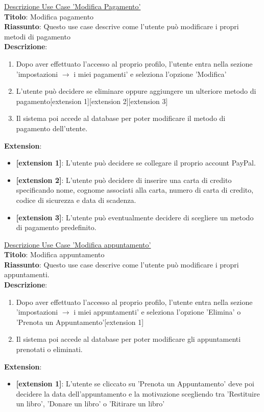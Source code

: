 \documentclass{article}
\begin{document}
    \noindent\underline{Descrizione Use Case 'Modifica Pagamento'}\\
    \textbf{Titolo}: Modifica pagamento\\
    \textbf{Riassunto}: Questo use case descrive come l'utente può modificare i propri metodi di pagamento\\
    \textbf{Descrizione}: 
        \begin{enumerate}
        \item Dopo aver effettuato l'accesso al proprio profilo, l'utente entra nella sezione 'impostazioni $\rightarrow$ i miei pagamenti' e seleziona l'opzione 'Modifica'
        \item L'utente può decidere se eliminare oppure aggiungere un ulteriore metodo di pagamento[extension 1][extension 2][extension 3]
        \item Il sistema poi accede al database per poter modificare il metodo di pagamento dell'utente.
    \end{enumerate}
    \textbf{Extension}: 
        \begin{itemize}
            \item \textbf{[extension 1]}: L'utente può decidere se collegare il proprio account PayPal.
            \item \textbf{[extension 2]}: L'utente può decidere di inserire una carta di credito specificando nome, cognome associati alla carta, numero di carta di credito, codice di sicurezza e data di scadenza.
            \item \textbf{[extension 3]}: L'utente può eventualmente decidere di scegliere un metodo di pagamento predefinito.
        \end{itemize}

    \noindent\underline{Descrizione Use Case 'Modifica appuntamento'}\\
    \textbf{Titolo}: Modifica appuntamento\\
    \textbf{Riassunto}: Questo use case descrive come l'utente può modificare i propri appuntamenti.\\
    \textbf{Descrizione}: 
    \begin{enumerate}
        \item Dopo aver effettuato l'accesso al proprio profilo, l'utente entra nella sezione 'impostazioni $\rightarrow$ i miei appuntamenti' e seleziona l'opzione 'Elimina' o 'Prenota un Appuntamento'[extension 1]
        \item Il sistema poi accede al database per poter modificare gli appuntamenti prenotati o eliminati.
    \end{enumerate}
    \textbf{Extension}: 
        \begin{itemize}
            \item \textbf{[extension 1]}: L'utente se cliccato su 'Prenota un Appuntamento' deve poi decidere la data dell'appuntamento e la motivazione scegliendo tra 'Restituire un libro', 'Donare un libro' o 'Ritirare un libro'
        \end{itemize}
\end{document}
